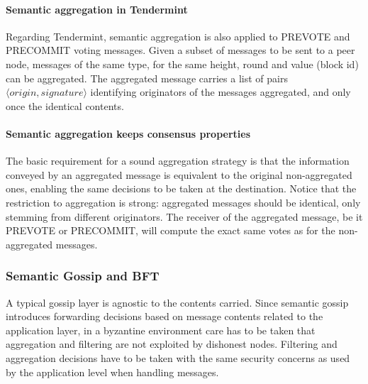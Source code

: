 \paragraph{Semantic aggregation in Tendermint}

Regarding Tendermint, semantic aggregation is also applied to 
\textsc{PREVOTE} and \textsc{PRECOMMIT} voting messages.
Given a subset of messages to be sent to a peer node, messages of the same type, 
for the same height, round and value (block id) can be aggregated.
The aggregated message carries a list of pairs $\langle origin, signature \rangle$ 
identifying originators of the  messages aggregated, and only once the identical contents.

\paragraph{Semantic aggregation keeps consensus properties}

The basic requirement for a sound aggregation strategy is that the information conveyed by an 
aggregated message is equivalent to the original non-aggregated ones, enabling the same decisions to be taken at the destination.
%
Notice that the restriction to aggregation is strong: aggregated messages should be identical, only stemming from different originators.   
%
The receiver of the aggregated message, be it \textsc{PREVOTE} or \textsc{PRECOMMIT}, will compute the exact same votes as for the non-aggregated messages.
%

\subsubsection{Semantic Gossip and BFT}

A typical gossip layer is agnostic to the contents carried.  Since semantic gossip introduces forwarding decisions based 
on message contents related to the application layer,  in a byzantine environment 
care has to be taken that aggregation and filtering are not exploited by dishonest nodes.
Filtering and aggregation decisions have to be taken with the same security concerns as used by the application level
when handling messages.    

